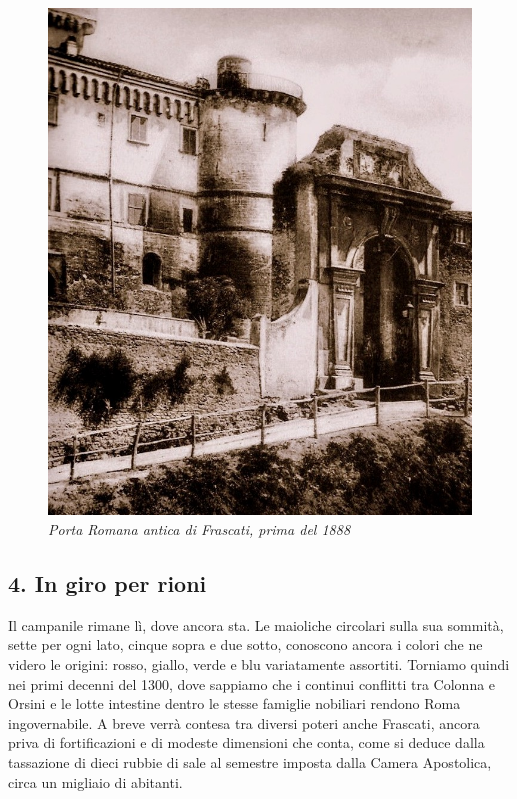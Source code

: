 \documentclass[
  letterpaper,
  DIV=11,
  numbers=noendperiod]{scrartcl}
\begin{document}
\begin{figure}[H]

{\centering \includegraphics{../../images/2024/san_rocco/5porta_romana-antica.jpeg}

}

\caption{\emph{Porta Romana antica di Frascati, prima del 1888}}

\end{figure}%

\subsection{4. In giro per rioni}\label{in-giro-per-rioni}

Il campanile rimane lì, dove ancora sta. Le maioliche circolari sulla
sua sommità, sette per ogni lato, cinque sopra e due sotto, conoscono
ancora i colori che ne videro le origini: rosso, giallo, verde e blu
variatamente assortiti. Torniamo quindi nei primi decenni del 1300, dove
sappiamo che i continui conflitti tra Colonna e Orsini e le lotte
intestine dentro le stesse famiglie nobiliari rendono Roma
ingovernabile. A breve verrà contesa tra diversi poteri anche Frascati,
ancora priva di fortificazioni e di modeste dimensioni che conta, come
si deduce dalla tassazione di dieci rubbie di sale al semestre imposta
dalla Camera Apostolica, circa un migliaio di abitanti.
\end{document}
